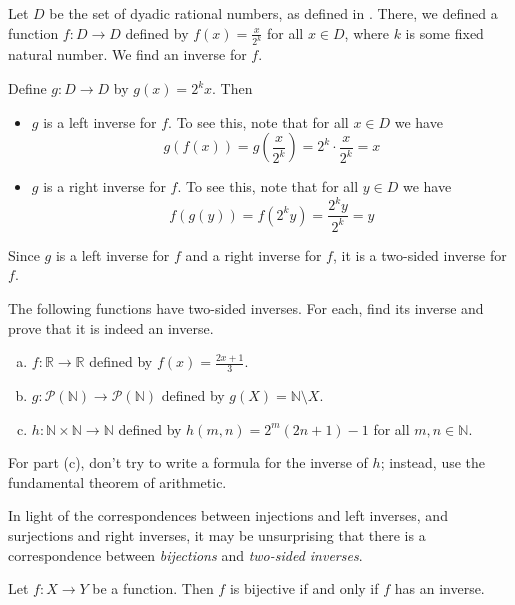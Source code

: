 \begin{example}
Let $D$ be the set of dyadic rational numbers, as defined in . There, we defined a function $f : D \to D$ defined by $f(x)=\frac{x}{2^k}$ for all $x \in D$, where $k$ is some fixed natural number. We find an inverse for $f$.

Define $g : D \to D$ by $g(x) = 2^kx$. Then
\begin{itemize}
\item $g$ is a left inverse for $f$. To see this, note that for all $x \in D$ we have
\[ g(f(x)) = g(\frac{x}{2^k}) = 2^k \cdot \frac{x}{2^k} = x \]
\item $g$ is a right inverse for $f$. To see this, note that for all $y \in D$ we have
\[ f(g(y)) = f(2^ky) = \frac{2^ky}{2^k} = y \]
\end{itemize}
Since $g$ is a left inverse for $f$ and a right inverse for $f$, it is a two-sided inverse for $f$.
\end{example}

\begin{exercise}
\label{exFindTwoSidedInverses}
The following functions have two-sided inverses. For each, find its inverse and prove that it is indeed an inverse.
\begin{enumerate}[(a)]
\item $f : \mathbb{R} \to \mathbb{R}$ defined by $f(x)=\frac{2x+1}{3}$.
\item $g : \mathcal{P}(\mathbb{N}) \to \mathcal{P}(\mathbb{N})$ defined by $g(X) = \mathbb{N} \setminus X$.
\item $h : \mathbb{N} \times \mathbb{N} \to \mathbb{N}$ defined by $h(m,n) = 2^m(2n+1)-1$ for all $m,n \in \mathbb{N}$.
\end{enumerate}
\begin{backhint}
For part (c), don't try to write a formula for the inverse of $h$; instead, use the fundamental theorem of arithmetic.
\end{backhint}
\end{exercise}

In light of the correspondences between injections and left inverses, and surjections and right inverses, it may be unsurprising that there is a correspondence between \textit{bijections} and \textit{two-sided inverses}.

\begin{exercise}
\label{exBijectiveIffHasInverse}
Let $f : X \to Y$ be a function. Then $f$ is bijective if and only if $f$ has an inverse.
\end{exercise}


